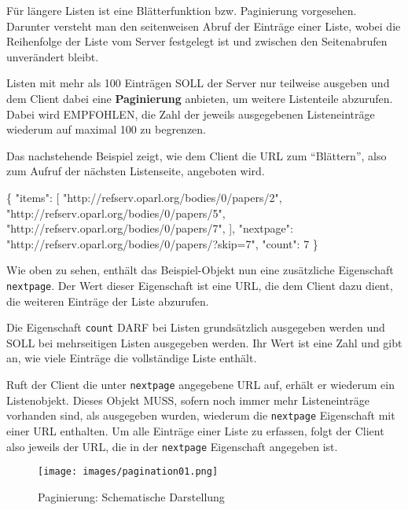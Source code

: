 \documentclass[,a4paper]{article}
\makeatletter
\newenvironment{Shaded}{}{}
\newcommand{\DataTypeTok}[1]{\textcolor[rgb]{0.56,0.13,0.00}{{#1}}}
\newcommand{\DecValTok}[1]{\textcolor[rgb]{0.25,0.63,0.44}{{#1}}}
\newcommand{\StringTok}[1]{\textcolor[rgb]{0.25,0.44,0.63}{{#1}}}
\newcommand{\NormalTok}[1]{{#1}}
\def\maxwidth{\ifdim\Gin@nat@width>\linewidth\linewidth
\else\Gin@nat@width\fi}
\let\Oldincludegraphics\includegraphics
\renewcommand{\includegraphics}[1]{\Oldincludegraphics[width=\maxwidth]{#1}}
\makeatother
\begin{document}
Für längere Listen ist eine Blätterfunktion bzw. Paginierung vorgesehen.
Darunter versteht man den seitenweisen Abruf der Einträge einer Liste,
wobei die Reihenfolge der Liste vom Server festgelegt ist und zwischen
den Seitenabrufen unverändert bleibt.

Listen mit mehr als 100 Einträgen SOLL der Server nur teilweise ausgeben
und dem Client dabei eine \textbf{Paginierung} anbieten, um weitere
Listenteile abzurufen. Dabei wird EMPFOHLEN, die Zahl der jeweils
ausgegebenen Listeneinträge wiederum auf maximal 100 zu begrenzen.

Das nachstehende Beispiel zeigt, wie dem Client die URL zum
``Blättern'', also zum Aufruf der nächsten Listenseite, angeboten wird.

\begin{Shaded}
\begin{Highlighting}[]
\NormalTok{\{}
    \DataTypeTok{"items"}\NormalTok{: [}
        \StringTok{"http://refserv.oparl.org/bodies/0/papers/2"}\NormalTok{,}
        \StringTok{"http://refserv.oparl.org/bodies/0/papers/5"}\NormalTok{,}
        \StringTok{"http://refserv.oparl.org/bodies/0/papers/7"}\NormalTok{,}
    \NormalTok{],}
    \DataTypeTok{"nextpage"}\NormalTok{: }\StringTok{"http://refserv.oparl.org/bodies/0/papers/?skip=7"}\NormalTok{,}
    \DataTypeTok{"count"}\NormalTok{: }\DecValTok{7}
\NormalTok{\}}
\end{Highlighting}
\end{Shaded}

Wie oben zu sehen, enthält das Beispiel-Objekt nun eine zusätzliche
Eigenschaft \texttt{nextpage}. Der Wert dieser Eigenschaft ist eine URL,
die dem Client dazu dient, die weiteren Einträge der Liste abzurufen.

Die Eigenschaft \texttt{count} DARF bei Listen grundsätzlich ausgegeben
werden und SOLL bei mehrseitigen Listen ausgegeben werden. Ihr Wert ist
eine Zahl und gibt an, wie viele Einträge die vollständige Liste
enthält.

Ruft der Client die unter \texttt{nextpage} angegebene URL auf, erhält
er wiederum ein Listenobjekt. Dieses Objekt MUSS, sofern noch immer mehr
Listeneinträge vorhanden sind, als ausgegeben wurden, wiederum die
\texttt{nextpage} Eigenschaft mit einer URL enthalten. Um alle Einträge
einer Liste zu erfassen, folgt der Client also jeweils der URL, die in
der \texttt{nextpage} Eigenschaft angegeben ist.

\begin{figure}[htbp]
\centering
\texttt{[image: images/pagination01.png]}
\caption{Paginierung: Schematische Darstellung}
\end{figure}
\end{document}
